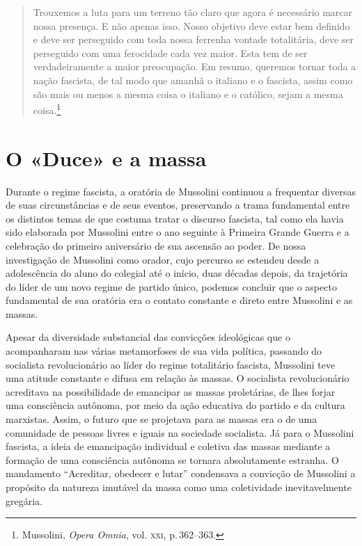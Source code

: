 \begin{quote}
Trouxemos a luta para um terreno tão claro que agora é necessário marcar
nossa presença. E não apenas isso. Nosso objetivo deve estar bem
definido e deve ser perseguido com toda nossa ferrenha vontade
totalitária, deve ser perseguido com uma ferocidade cada vez maior. Esta
tem de ser verdadeiramente a maior preocupação. Em resumo, queremos
tornar toda a nação fascista, de tal modo que amanhã o italiano e o
fascista, assim como são mais ou menos a mesma coisa o italiano e o
católico, sejam a mesma coisa.\footnote{Mussolini, \emph{Opera Omnia},
  vol. \textsc{xxi}, p.\,362--363.}
\end{quote}

\section{O «Duce» e a massa}

Durante o regime fascista, a oratória de Mussolini continuou a
frequentar diversas de suas circunstâncias e de seus eventos,
preservando a trama fundamental entre os distintos temas de que costuma
tratar o discurso fascista, tal como ela havia sido elaborada por
Mussolini entre o ano seguinte à Primeira Grande Guerra e a celebração
do primeiro aniversário de sua ascensão ao poder. De nossa investigação
de Mussolini como orador, cujo percurso se estendeu desde a adolescência
do aluno do colegial até o início, duas décadas depois, da trajetória do
líder de um novo regime de partido único, podemos concluir que o aspecto
fundamental de sua oratória era o contato constante e direto entre
Mussolini e as massas.

Apesar da diversidade substancial das convicções ideológicas que o
acompanharam nas várias metamorfoses de sua vida política, passando do
socialista revolucionário ao líder do regime totalitário fascista,
Mussolini teve uma atitude constante e difusa em relação às massas. O
socialista revolucionário acreditava na possibilidade de emancipar as
massas proletárias, de lhes forjar uma consciência autônoma, por meio da
ação educativa do partido e da cultura marxistas. Assim, o futuro que se
projetava para as massas era o de uma comunidade de pessoas livres e
iguais na sociedade socialista. Já para o Mussolini fascista, a ideia de
emancipação individual e coletiva das massas mediante a formação de uma
consciência autônoma se tornara absolutamente estranha. O mandamento
``Acreditar, obedecer e lutar'' condensava a convicção de Mussolini a
propósito da natureza imutável da massa como uma coletividade
inevitavelmente gregária.

